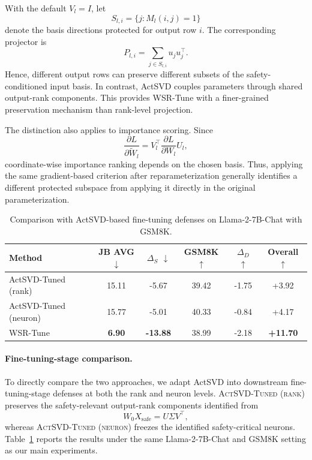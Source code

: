 \documentclass{article}
\begin{document}
With the default $V_l=I$, let
\begin{equation}
    S_{l,i}=\{j:M_l(i,j)=1\}
\end{equation}
denote the basis directions protected for output row $i$. The corresponding projector is
\begin{equation}
    P_{l,i}
    =
    \sum_{j\in S_{l,i}}u_ju_j^\top.
\end{equation}
Hence, different output rows can preserve different subsets of the safety-conditioned input basis. In contrast, ActSVD couples parameters through shared output-rank components. This provides WSR-Tune with a finer-grained preservation mechanism than rank-level projection.

The distinction also applies to importance scoring. Since
\begin{equation}
    \frac{\partial L}{\partial \widetilde W_l}
    =
    V_l^\top
    \frac{\partial L}{\partial W_l}
    U_l,
\end{equation}
coordinate-wise importance ranking depends on the chosen basis. Thus, applying the same gradient-based criterion after reparameterization generally identifies a different protected subspace from applying it directly in the original parameterization.


\begin{table}[H]
\centering
\caption{Comparison with ActSVD-based fine-tuning defenses on Llama-2-7B-Chat with GSM8K.}
\label{tab:actsved_comparison}
\begin{tabular}{lccccc}
\toprule
Method
& JB AVG $\downarrow$
& $\Delta_S$ $\downarrow$
& GSM8K $\uparrow$
& $\Delta_D$ $\uparrow$
& Overall $\uparrow$ \\
\midrule
ActSVD-Tuned (rank)
& 15.11 & -5.67 & 39.42 & -1.75 & +3.92 \\
ActSVD-Tuned (neuron)
& 15.77 & -5.01 & 40.33 & -0.84 & +4.17 \\
WSR-Tune
& \textbf{6.90} & \textbf{-13.88} & 38.99 & -2.18 & \textbf{+11.70} \\
\bottomrule
\end{tabular}
\end{table}


\paragraph{Fine-tuning-stage comparison.}
To directly compare the two approaches, we adapt ActSVD into downstream fine-tuning-stage defenses at both the rank and neuron levels. \textsc{ActSVD-Tuned (rank)} preserves the safety-relevant output-rank components identified from
\begin{equation}
    W_0X_{\mathrm{safe}}
    =
    U\Sigma V^\top,
\end{equation}
whereas \textsc{ActSVD-Tuned (neuron)} freezes the identified safety-critical neurons. Table~\ref{tab:actsved_comparison} reports the results under the same Llama-2-7B-Chat and GSM8K setting as our main experiments.
\end{document}
